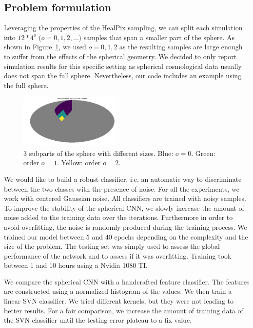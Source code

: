 \documentclass[final,twocolumn,3p,times,authoryear]{elsarticle}
\newcommand{\todo}[1]{{\color[rgb]{.6,.1,.6}{#1}}}
\newcommand{\1}{\b{1}}              %
\newcommand{\0}{\b{0}}              %
\begin{document}
\subsection{Problem formulation}

Leveraging the properties of the HealPix sampling, we can split each simulation
into $12*4^o$ ($o=0,1,2,\dots$) samples that span a smaller part of the sphere.
As shown in Figure~\ref{fig:subpart_sphere}, we used $o=0,1,2$ as the resulting
samples are large enough to suffer from the effects of the spherical geometry. We
decided to only report simulation results for this specific setting as spherical
cosmological data usually does not span the full sphere. Nevertheless, our code
includes an example using the full sphere.

\begin{figure}[!ht]
\centering
\includegraphics[width=0.45\textwidth]{figures/part_sphere.pdf}
\caption{3 subparts of the sphere with different sizes. Blue: $o=0$. Green: order $o=1$. Yellow: order $o=2$.}
\label{fig:subpart_sphere}
\end{figure}

We would like to build a robust classifier, i.e. an automatic way to
discriminate between the two classes with the presence of noise. For all the
experiments, we work with centered Gaussian noise. \todo{Tomek: could you put a
justification.} All classifiers are trained with noisy samples. To improve the
stability of the spherical CNN, we slowly increase the amount of noise added to
the training data over the iterations. Furthermore in order to avoid
overfitting, the noise is randomly produced during the training process. We trained our
model between $5$ and $40$ epochs depending on the complexity and the size of
the problem. The testing set was simply used to assess the global performance of
the network and to assess if it was overfitting.
Training took between $1$ and $10$ hours using a Nvidia 1080 TI.

We compare the spherical CNN with a handcrafted feature classifier. \cite{...}
\todo{Tomek: we probably need 1 or two other classifiers.} The features are
constructed using a normalized histogram of the values. We then train a linear
SVN classifier. We tried different kernels, but they were not leading to better
results. For a fair comparison, we increase the amount of training data of the
SVN classifier until the testing error plateau to a fix value.
\end{document}
